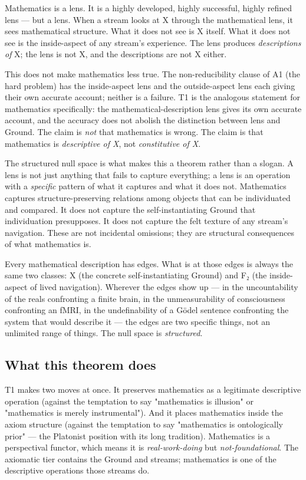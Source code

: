 \documentclass[11pt, openany]{book}
\begin{document}
Mathematics is a lens. It is a highly developed, highly successful, highly refined lens --- but a lens. When a stream looks at X through the mathematical lens, it sees mathematical structure. What it does not see is X itself. What it does not see is the inside-aspect of any stream's experience. The lens produces \textit{descriptions of} X; the lens is not X, and the descriptions are not X either.

This does not make mathematics less true. The non-reducibility clause of A1 (the hard problem) has the inside-aspect lens and the outside-aspect lens each giving their own accurate account; neither is a failure. T1 is the analogous statement for mathematics specifically: the mathematical-description lens gives its own accurate account, and the accuracy does not abolish the distinction between lens and Ground. The claim is \textit{not} that mathematics is wrong. The claim is that mathematics is \textit{descriptive of X}, not \textit{constitutive of X}.

The structured null space is what makes this a theorem rather than a slogan. A lens is not just anything that fails to capture everything; a lens is an operation with a \textit{specific} pattern of what it captures and what it does not. Mathematics captures structure-preserving relations among objects that can be individuated and compared. It does not capture the self-instantiating Ground that individuation presupposes. It does not capture the felt texture of any stream's navigation. These are not incidental omissions; they are structural consequences of what mathematics is.

Every mathematical description has edges. What is at those edges is always the same two classes: X (the concrete self-instantiating Ground) and F₂ (the inside-aspect of lived navigation). Wherever the edges show up --- in the uncountability of the reals confronting a finite brain, in the unmeasurability of consciousness confronting an fMRI, in the undefinability of a Gödel sentence confronting the system that would describe it --- the edges are two specific things, not an unlimited range of things. The null space is \textit{structured}.

\subsection{What this theorem does}

T1 makes two moves at once. It preserves mathematics as a legitimate descriptive operation (against the temptation to say "mathematics is illusion" or "mathematics is merely instrumental"). And it places mathematics inside the axiom structure (against the temptation to say "mathematics is ontologically prior" --- the Platonist position with its long tradition). Mathematics is a perspectival functor, which means it is \textit{real-work-doing} but \textit{not-foundational}. The axiomatic tier contains the Ground and streams; mathematics is one of the descriptive operations those streams do.
\end{document}
